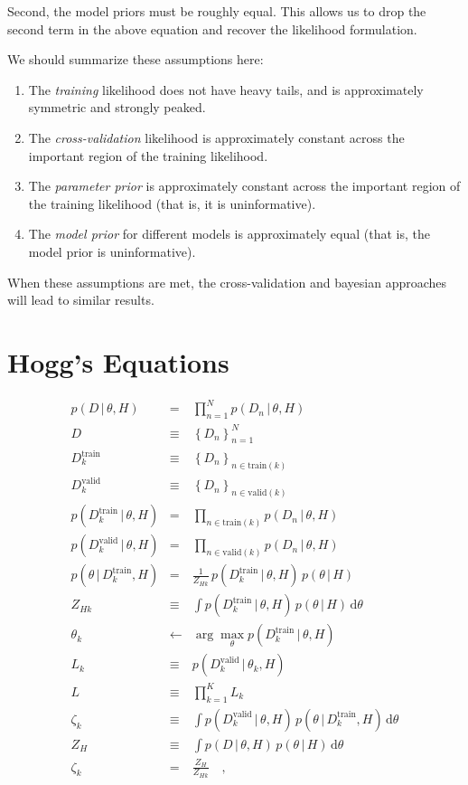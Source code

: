 \documentclass[12pt]{article}
\newcommand{\given}{\,|\,}
\newcommand{\setof}[1]{\left\{{#1}\right\}}
\newcommand{\train}{\mathrm{train}}
\newcommand{\valid}{\mathrm{valid}}
\newcommand{\dd}{\mathrm{d}}
\begin{document}
Second, the model priors must be roughly equal.  This allows us to drop the
second term in the above equation and recover the likelihood formulation.

We should summarize these assumptions here:
\begin{enumerate}
  \item The {\it training} likelihood does not have heavy tails, and is
    approximately symmetric and strongly peaked.
  \item The {\it cross-validation} likelihood is approximately constant
    across the important region of the training likelihood.
  \item The {\it parameter prior} is approximately constant across the important
    region of the training likelihood (that is, it is uninformative).
  \item The {\it model prior} for different models is approximately equal
    (that is, the model prior is uninformative).
\end{enumerate}
When these assumptions are met, the cross-validation and bayesian approaches
will lead to similar results.

\section{Hogg's Equations}

\begin{eqnarray}
p(D\given\theta,H) &=& \prod_{n=1}^N p(D_n\given\theta,H)
\\
D &\equiv& \setof{D_n}_{n=1}^N
\\
D^\train_k &\equiv& \setof{D_n}_{n\in\train(k)}
\\
D^\valid_k &\equiv& \setof{D_n}_{n\in\valid(k)}
\\
p(D^\train_k\given\theta,H) &=& \prod_{n\in\train(k)} p(D_n\given\theta,H)
\\
p(D^\valid_k\given\theta,H) &=& \prod_{n\in\valid(k)} p(D_n\given\theta,H)
\\
p(\theta\given D^\train_k,H) &=& \frac{1}{Z_{Hk}}\,p(D^\train_k\given\theta,H)\,p(\theta\given H)
\\
Z_{Hk} &\equiv& \int p(D^\train_k\given\theta,H)\,p(\theta\given H)\,\dd\theta
\\
\theta_k &\leftarrow& \arg\max_\theta p(D^\train_k\given\theta,H)
\\
L_k &\equiv& p(D^\valid_k\given\theta_k,H)
\\
L &\equiv& \prod_{k=1}^K L_k
\\
\zeta_k &\equiv& \int p(D^\valid_k\given\theta,H)\,p(\theta\given D^\train_k,H)\,\dd\theta
\\
Z_H &\equiv& \int p(D\given\theta,H)\,p(\theta\given H)\,\dd\theta
\\
\zeta_k &=& \frac{Z_H}{Z_{Hk}}
\quad,
\end{eqnarray}
\end{document}
